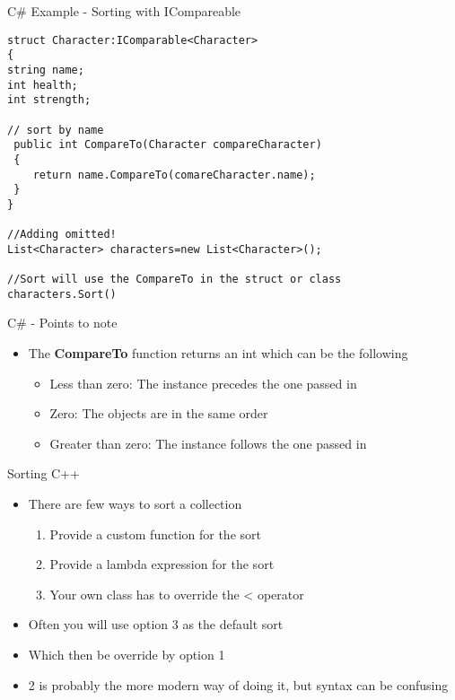 \begin{frame}[fragile]{C\# Example - Sorting with ICompareable }
\begin{lstlisting}
struct Character:IComparable<Character>
{
string name;
int health;
int strength;

// sort by name
 public int CompareTo(Character compareCharacter)
 {
 	return name.CompareTo(comareCharacter.name);
 }
}

//Adding omitted!
List<Character> characters=new List<Character>();

//Sort will use the CompareTo in the struct or class
characters.Sort()
\end{lstlisting}
\end{frame}

\begin{frame}{C\# - Points to note}
	\begin{itemize}
		\pause \item The \textbf{CompareTo} function returns an int which can be the following
		\begin{itemize}
			\pause \item Less than zero: The instance precedes the one passed in
			\pause \item Zero: The objects are in the same order
			\pause \item Greater than zero: The instance follows the one passed in
		\end{itemize} 
	\end{itemize}
\end{frame}

\begin{frame}{Sorting C++}
\begin{itemize}
	\pause \item There are few ways to sort a collection
	\begin{enumerate}
		\pause \item Provide a custom function for the sort
		\pause \item Provide a lambda expression for the sort
		\pause \item Your own class has to override the < operator
	\end{enumerate}
	\pause \item Often you will use option 3 as the default sort
	\pause \item Which then be override by option 1 
	\pause \item 2 is probably the more modern way of doing it, but syntax can be confusing
\end{itemize}
\end{frame}

